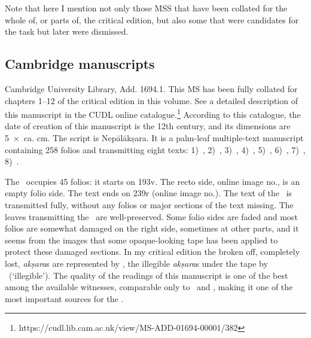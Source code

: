 Note that here I mention not only those MSS that
have been collated for the whole of, or parts of,
the critical edition, but also some that were candidates
for the task but later were dismissed.		




\medskip
\label{mss_descr}
\subsection{Cambridge manuscripts}

Cambridge University Library, Add. 1694.1. This MS has been 
fully collated for chapters 1--12 of the critical edition in this volume. 
See a detailed description of this manuscript in the 
CUDL online catalogue.\footnote{https://cudl.lib.cam.ac.uk/view/MS-ADD-01694-00001/382}
According to this catalogue, the date of creation of this manuscript 
is the 12th century, and its dimensions are 5~×~ca. cm. 
The script is Nepālākṣara. It is a palm-leaf multiple-text manuscript containing 258
folios and transmitting eight texts: 
1)~\SDhS,
2)~\SDhU,
3)~\SDhSangr,
4)~\Ums,
5)~\Uums, 
6)~\Vss,
7)~\DharmP,
8)~\SivaUp.

The \VSS\ occupies 45 folios: it starts on \fol193v. 
The recto side, online image no., is an empty folio side. 
The text ends on \fol239r (online image no.). 
The text of the \VSS\ is transmitted fully,
without any folios or major sections of the text missing. The leaves
transmitting the \VSS\ are well-preserved. Some folio sides are faded and
most folios are somewhat damaged on the right side, 
sometimes at other parts, and it seems from the images 
that some opaque-looking tape has been applied to protect these damaged sections. 
In my critical edition the broken off, completely lost, 
\emph{akṣara}s are represented by \lac,
the illegible \emph{akṣara}s under the tape by \lk\ (`illegible'). The
quality of the readings of this manuscript is one of the best among
the available witnesses, comparable only to \msNa\ and \msParis, 
making it one of the most important sources for the \VSS.


